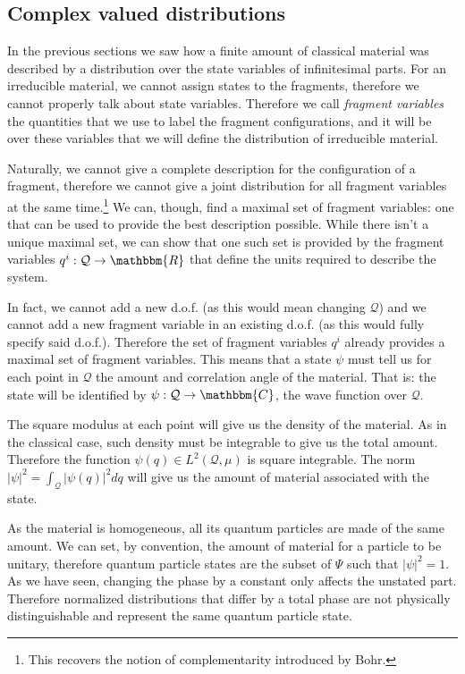 \documentclass[aps,pra,10pt,twocolumn,floatfix,nofootinbib]{revtex4-1}
\numberwithin{equation}{section}
\theoremstyle{definition}
\begin{document}
\subsection{Complex valued distributions}

In the previous sections we saw how a finite amount of classical material was described by a distribution over the state variables of infinitesimal parts. For an irreducible material, we cannot assign states to the fragments, therefore we cannot properly talk about state variables. Therefore we call \emph{fragment variables} the quantities that we use to label the fragment configurations, and it will be over these variables that we will define the distribution of irreducible material.

Naturally, we cannot give a complete description for the configuration of a fragment, therefore we cannot give a joint distribution for all fragment variables at the same time.\footnote{This recovers the notion of complementarity introduced by Bohr.} We can, though, find a maximal set of fragment variables: one that can be used to provide the best description possible. While there isn't a unique maximal set, we can show that one such set is provided by the fragment variables $q^i : \mathcal{Q} \rightarrow \mathbbm{R}$ that define the units required to describe the system.

In fact, we cannot add a new d.o.f. (as this would mean changing $\mathcal{Q}$) and we cannot add a new fragment variable in an existing d.o.f. (as this would fully specify said d.o.f.). Therefore the set of fragment variables $q^i$ already provides a maximal set of fragment variables. This means that a state $\psi$ must tell us for each point in $\mathcal{Q}$ the amount and correlation angle of the material. That is: the state will be identified by $\psi : \mathcal{Q} \rightarrow \mathbbm{C}$, the wave function over $\mathcal{Q}$.

The square modulus at each point will give us the density of the material. As in the classical case, such density must be integrable to give us the total amount. Therefore the function $\psi(q) \in L^2(\mathcal{Q}, \mu)$ is square integrable. The norm $|\psi|^2 = \int_{\mathcal{Q}} |\psi(q)|^2 dq$ will give us the amount of material associated with the state.

As the material is homogeneous, all its quantum particles are made of the same amount. We can set, by convention, the amount of material for a particle to be unitary, therefore quantum particle states are the subset of $\Psi$ such that $|\psi|^2 = 1$. As we have seen, changing the phase by a constant only affects the unstated part. Therefore normalized distributions that differ by a total phase are not physically distinguishable and represent the same quantum particle state.
\end{document}
